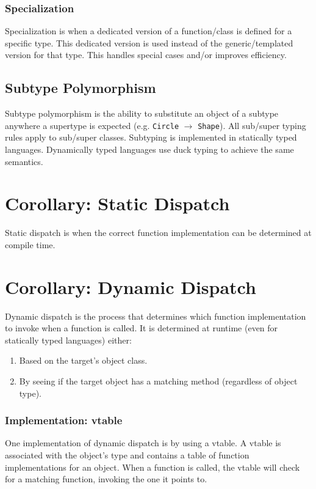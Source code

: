 \documentclass{article}
\begin{document}
\subsubsection{Specialization}
Specialization is when a dedicated version of a function/class is
defined for a specific type. This dedicated version is used instead of
the generic/templated version for that type. This handles special
cases and/or improves efficiency.



\subsection{Subtype Polymorphism}
Subtype polymorphism is the ability to substitute an object of a
subtype anywhere a supertype is expected (e.g. \texttt{Circle} $\to$
\texttt{Shape}). All sub/super typing rules apply to sub/super
classes. Subtyping is implemented in statically typed
languages. Dynamically typed languages use duck typing to achieve the
same semantics.


\section{Corollary: Static Dispatch}
Static dispatch is when the correct function implementation can be
determined at compile time.

\section{Corollary: Dynamic Dispatch}
Dynamic dispatch is the process that determines which function
implementation to invoke when a function is called. It is determined
at runtime (even for statically typed languages) either:
\begin{enumerate}[label=(\roman*)]
\item Based on the target's object class.
\item By seeing if the target object has a matching method (regardless
  of object type).
\end{enumerate}

\subsubsection{Implementation: vtable}
One implementation of dynamic dispatch is by using a vtable. A vtable
is associated with the object's type and contains a table of function
implementations for an object. When a function is called, the vtable
will check for a matching function, invoking the one it points to.
\end{document}
